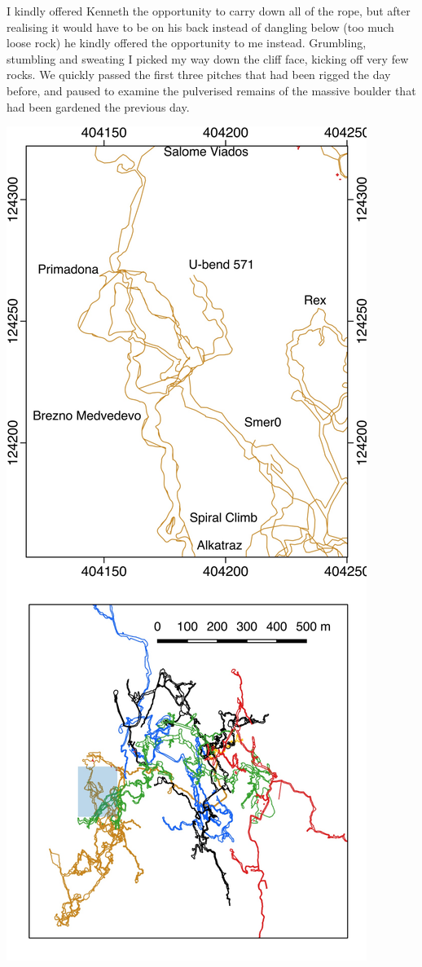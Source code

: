 I kindly offered Kenneth the opportunity to carry down all of the rope, but after realising it would have to be on his back instead of dangling below (too much loose rock) he kindly offered the opportunity to me instead. Grumbling, stumbling and sweating I picked my way down the cliff face, kicking off very few rocks. We quickly passed the first three pitches that had been rigged the day before, and paused to examine the pulverised remains of the massive boulder that had been gardened the previous day.

\begin{marginfigure}
\checkoddpage \ifoddpage \forcerectofloat \else \forceversofloat \fi
\centering
 \includegraphics[width=\linewidth]{images/little_insets/ent_prim_inset.pdf}

\end{marginfigure}
